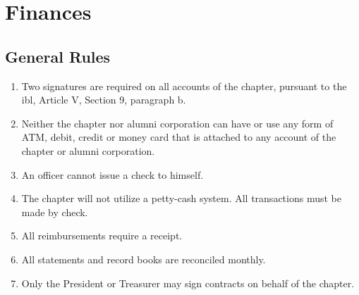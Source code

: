 
\chapter{Finances}


\section{General Rules}
	\label{fin-rules}
	\begin{enumerate}
		\item Two signatures are required on all accounts of the chapter, pursuant to the \gls{ibl}, Article V, Section 9, paragraph b.
		\item Neither the chapter nor alumni corporation can have or use any form of ATM, debit, credit or money card that is attached to any account of the chapter or alumni corporation.
		\item An officer cannot issue a check to himself.
		\item The chapter will not utilize a petty-cash system. All transactions must be made by
		check.
		\item All reimbursements require a receipt.
		\item All statements and record books are reconciled monthly.
        \item Only the President or Treasurer may sign contracts on behalf of the chapter.
	\end{enumerate}

